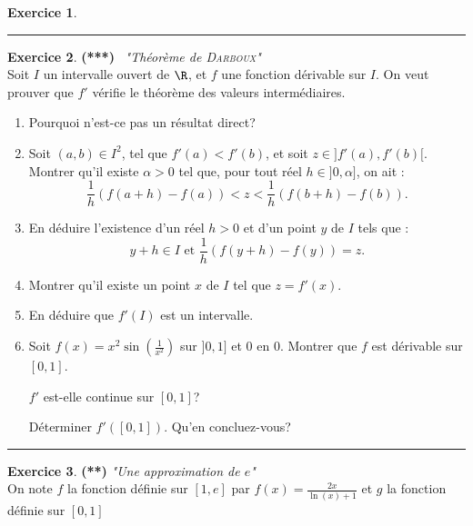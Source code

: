 \documentclass[a4paper,11pt]{article}
\theoremstyle{definition}
\newtheorem{exo}{Exercice} %
\begin{document}
\begin{minipage}{1\linewidth}
\begin{minipage}[t]{0.48\linewidth}
\begin{exo}
	\centering
	\rule{1\linewidth}{0.6pt}
	\end{exo}

		
		
	\end{minipage}	
	\hfill\vrule\hfill
	\begin{minipage}[t]{0.48\linewidth}
		\raggedright
		
		
		
		
		
		\begin{exo}\textbf{(***)} \ \textit{"Théorème de \textsc{Darboux}"}\quad\\[0.2cm]
			Soit $I$ un intervalle ouvert de $\R$, et $f$ une fonction dérivable sur $I$. On veut prouver que $f'$ vérifie le théorème des valeurs intermédiaires.
			\begin{enumerate}
				\item Pourquoi n'est-ce pas un résultat direct?
				\item Soit $(a,b)\in I^2$, tel que $f'(a)<f'(b)$, et soit $z\in]f'(a),f'(b)[$. Montrer qu'il existe $\alpha>0$ tel que, pour tout réel $h\in]0,\alpha]$, on ait :
				$$\frac{1}{h}\left(f(a+h)-f(a)\right)<z<\frac{1}{h}\left(f(b+h)-f(b)\right).$$
				\item En déduire l'existence d'un réel $h>0$ et d'un point $y$ de $I$ tels que :
				$$y+h\in I \textrm{ et }\frac{1}{h}\left(f(y+h)-f(y)\right)=z.$$
				\item Montrer qu'il existe un point $x$ de $I$ tel que $z=f'(x)$.
				\item En déduire que $f'(I)$ est un intervalle.
				\item Soit $f(x)=x^2\sin\left(\frac{1}{x^2}\right)$ sur $]0,1]$ et $0$ en $0$. Montrer que $f$ est dérivable sur $[0,1]$.
				
				 $f'$ est-elle continue sur $[0,1]$? 
				 
				 Déterminer $f'([0,1])$. Qu'en concluez-vous?
			\end{enumerate}
			
			\centering
			\rule{1\linewidth}{0.6pt}
		\end{exo}
		
		
		
		\begin{exo}\textbf{(**)} \textit{"Une approximation de $e$"}\quad\\[0.2cm]
			
			On note $f$ la fonction définie sur $[1,e]$ par $f(x)=\frac{2x}{\ln (x)+1}$ et $g$ la fonction définie sur $[0,1]$
			

\end{exo}
\end{minipage}
\end{minipage}
\end{document}
